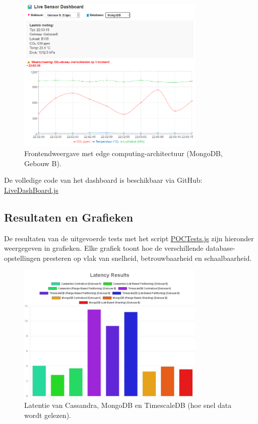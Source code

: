 \begin{figure}[H]
    \centering
    \includegraphics[width=0.8\textwidth]{GebouwB_MongoDb_Website.png}
    \caption{Frontendweergave met edge computing-architectuur (MongoDB, Gebouw B).}
    \label{fig:gebouw-b-architecture}
\end{figure}

De volledige code van het dashboard is beschikbaar via GitHub: \\
\href{https://github.com/WoutVC/bachelorproef2024/blob/main/proof_of_concept/frontend/src/components/LiveDashBoard.js}{LiveDashBoard.js}

\subsection{Resultaten en Grafieken}
De resultaten van de uitgevoerde tests met het script \href{https://github.com/WoutVC/bachelorproef2024/blob/main/proof_of_concept/backend/POCTests.js}{POCTests.js} zijn hieronder weergegeven in grafieken. Elke grafiek toont hoe de verschillende database-opstellingen presteren op vlak van snelheid, betrouwbaarheid en schaalbaarheid.

\begin{figure}[H]
	\centering
	\includegraphics[width=0.8\textwidth]{Latency.png}
	\caption{Latentie van Cassandra, MongoDB en TimescaleDB (hoe snel data wordt gelezen).}
	\label{fig:latency-comparison}
\end{figure}

